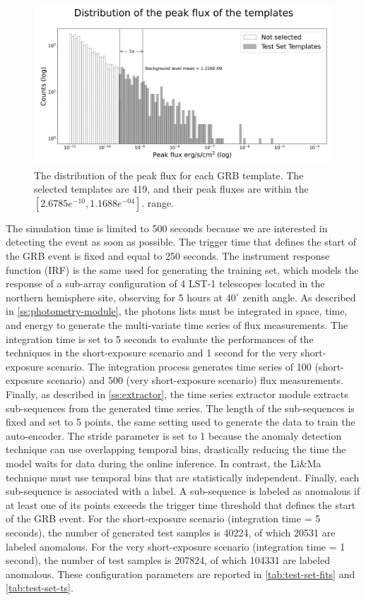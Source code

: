 \begin{figure}[!htb]
\centering
\includegraphics[width=1\textwidth]{figures/experiments/templates_max_flux_distributions.png}
\captionsetup{width=0.9\linewidth}
\caption{The distribution of the peak flux for each GRB template. The selected templates are 419, and their peak fluxes are within the $[2.6785e^{-10}, 1.1688e^{-04}]$. range.}
\label{f:exp-max-flux-distribution-E}
\end{figure}
The simulation time is limited to 500 seconds because we are interested in detecting the event as soon as possible. The trigger time that defines the start of the GRB event is fixed and equal to 250 seconds. The instrument response function (IRF) is the same used for generating the training set, which models the response of a sub-array configuration of 4 LST-1 telescopes located in the northern hemisphere site, observing for 5 hours at $40^{\circ}$ zenith angle.
As described in \autoref{ss:photometry-module}, the photons lists must be integrated in space, time, and energy to generate the multi-variate time series of flux measurements. The integration time is set to 5 seconds to evaluate the performances of the techniques in the short-exposure scenario and 1 second for the very short-exposure scenario. The integration process generates time series of 100 (short-exposure scenario) and 500 (very short-exposure scenario) flux measurements. Finally, as described in \autoref{ss:extractor}, the time series extractor module extracts sub-sequences from the generated time series. The length of the sub-sequences is fixed and set to 5 points, the same setting used to generate the data to train the auto-encoder. The stride parameter is set to 1 because the anomaly detection technique can use overlapping temporal bins, drastically reducing the time the model waits for data during the online inference. In contrast, the Li\&Ma technique must use temporal bins that are statistically independent. Finally, each sub-sequence is associated with a label. A sub-sequence is labeled as anomalous if at least one of its points exceeds the trigger time threshold that defines the start of the GRB event. For the short-exposure scenario (integration time = 5 seconds), the number of generated test samples is 40224, of which 20531 are labeled anomalous. For the very short-exposure scenario (integration time = 1 second), the number of test samples is 207824, of which 104331 are labeled anomalous. These configuration parameters are reported in \autoref{tab:test-set-fits} and \autoref{tab:test-set-ts}.

